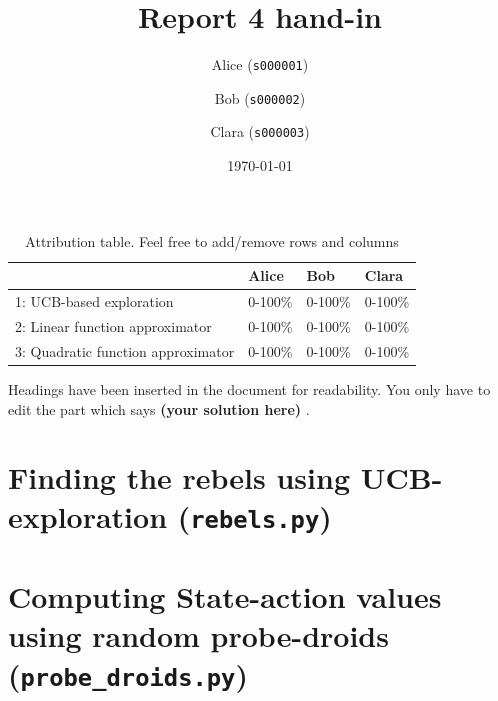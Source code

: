 \documentclass[12pt,twoside]{article}
\title{ Report 4 hand-in }
\date{ \today }
\author{Alice (\texttt{s000001})\and  Bob (\texttt{s000002})\and Clara (\texttt{s000003}) }
\newcommand\redt[1]{ {\textcolor[rgb]{0.60, 0.00, 0.00}{\textbf{ #1} } } }
\newcommand{\yoursolution}{ \redt{(your solution here) } }
\begin{document}
\maketitle

\begin{table}[ht!]
\caption{Attribution table. Feel free to add/remove rows and columns}
\begin{tabular}{llll}
\toprule
                                    & Alice   & Bob    & Clara   \\
\midrule
 1: UCB-based exploration           & 0-100\%  & 0-100\% & 0-100\%  \\
 2: Linear function approximator    & 0-100\%  & 0-100\% & 0-100\%  \\
 3: Quadratic function approximator & 0-100\%  & 0-100\% & 0-100\%  \\
\bottomrule
\end{tabular}
\end{table}


Headings have been inserted in the document for readability. You only have to edit the part which says \yoursolution. 

\section{Finding the rebels using UCB-exploration (\texttt{rebels.py})} 
\section{Computing State-action values using random probe-droids (\texttt{probe\_droids.py})} 
\end{document}
